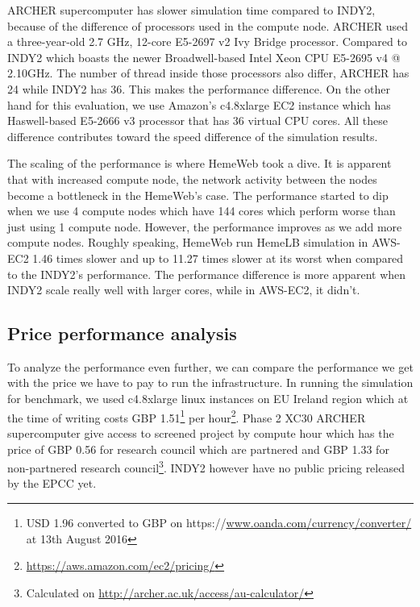 ARCHER supercomputer has slower simulation time compared to INDY2, because of the difference of processors used in the compute node. ARCHER used a three-year-old 2.7 GHz, 12-core E5-2697 v2 Ivy Bridge processor. Compared to INDY2 which boasts the newer Broadwell-based Intel Xeon CPU E5-2695 v4 @ 2.10GHz. The number of thread inside those processors also differ, ARCHER has 24 while INDY2 has 36. This makes the performance difference. On the other hand for this evaluation, we use Amazon's c4.8xlarge EC2 instance which has Haswell-based E5-2666 v3 processor that has 36 virtual CPU cores. All these difference contributes toward the speed difference of the simulation results.

The scaling of the performance is where HemeWeb took a dive. It is apparent that with increased compute node, the network activity between the nodes become a bottleneck in the HemeWeb's case. The performance started to dip when we use 4 compute nodes which have 144 cores which perform worse than just using 1 compute node. However, the performance improves as we add more compute nodes. Roughly speaking, HemeWeb run HemeLB simulation in AWS-EC2 1.46 times slower and up to 11.27 times slower at its worst when compared to the INDY2's performance. The performance difference is more apparent when INDY2 scale really well with larger cores, while in AWS-EC2, it didn't.

\subsection{Price performance analysis}

To analyze the performance even further, we can compare the performance we get with the price we have to pay to run the infrastructure. In running the simulation for benchmark, we used c4.8xlarge linux instances on EU Ireland region which at the time of writing costs GBP 1.51\footnote{USD 1.96 converted to GBP on https://\url{www.oanda.com/currency/converter/} at 13th August 2016} per hour\footnote{\url{https://aws.amazon.com/ec2/pricing/}}. Phase 2 XC30 ARCHER supercomputer give access to screened project by compute hour which has the price of GBP 0.56 for research council which are partnered and GBP 1.33 for  non-partnered research council\footnote{Calculated on \url{http://archer.ac.uk/access/au-calculator/}}. INDY2 however have no public pricing released by the EPCC yet.

